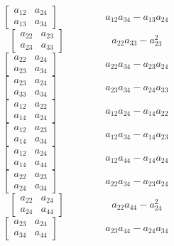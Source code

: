 \documentclass[12pt]{article}
\begin{document}
$$\left[\begin{matrix}a_{12} & a_{24}\\a_{13} & a_{34}\end{matrix}\right]\hspace{2cm} a_{12} a_{34} - a_{13} a_{24}$$   
$$\left[\begin{matrix}a_{22} & a_{23}\\a_{23} & a_{33}\end{matrix}\right]\hspace{2cm} a_{22} a_{33} - a_{23}^{2}$$   
$$\left[\begin{matrix}a_{22} & a_{24}\\a_{23} & a_{34}\end{matrix}\right]\hspace{2cm} a_{22} a_{34} - a_{23} a_{24}$$   
$$\left[\begin{matrix}a_{23} & a_{24}\\a_{33} & a_{34}\end{matrix}\right]\hspace{2cm} a_{23} a_{34} - a_{24} a_{33}$$   
$$\left[\begin{matrix}a_{12} & a_{22}\\a_{14} & a_{24}\end{matrix}\right]\hspace{2cm} a_{12} a_{24} - a_{14} a_{22}$$   
$$\left[\begin{matrix}a_{12} & a_{23}\\a_{14} & a_{34}\end{matrix}\right]\hspace{2cm} a_{12} a_{34} - a_{14} a_{23}$$   
$$\left[\begin{matrix}a_{12} & a_{24}\\a_{14} & a_{44}\end{matrix}\right]\hspace{2cm} a_{12} a_{44} - a_{14} a_{24}$$   
$$\left[\begin{matrix}a_{22} & a_{23}\\a_{24} & a_{34}\end{matrix}\right]\hspace{2cm} a_{22} a_{34} - a_{23} a_{24}$$   
$$\left[\begin{matrix}a_{22} & a_{24}\\a_{24} & a_{44}\end{matrix}\right]\hspace{2cm} a_{22} a_{44} - a_{24}^{2}$$   
$$\left[\begin{matrix}a_{23} & a_{24}\\a_{34} & a_{44}\end{matrix}\right]\hspace{2cm} a_{23} a_{44} - a_{24} a_{34}$$   
\end{document}
